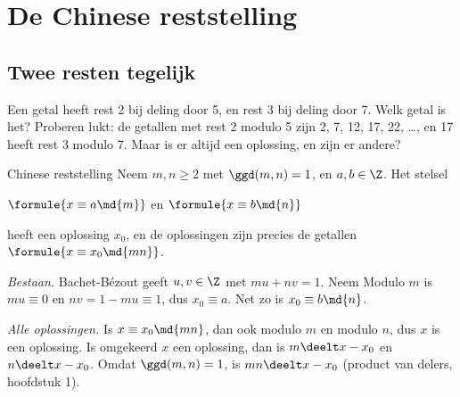 \section{De Chinese reststelling}

\subsection{Twee resten tegelijk}

Een getal heeft rest 2 bij deling door 5, en rest 3 bij deling door 7. Welk getal is het? Proberen lukt: de getallen met rest 2 modulo 5 zijn 2, 7, 12, 17, 22, \ldots, en 17 heeft rest 3 modulo 7. Maar is er altijd een oplossing, en zijn er andere?


\begin{theorie}
\begin{stelling}{Chinese reststelling}
Neem $m, n \geqslant 2$ met $\ggd(m, n) = 1$, en $a, b \in \Z$. Het stelsel

\vspace{1mm}
\qquad $\formule{x \equiv a \md{m}}$ \qquad en \qquad $\formule{x \equiv b \md{n}}$

\vspace{1mm}
heeft een oplossing $x_0$, en de oplossingen zijn precies de getallen $\formule{x \equiv x_0 \md{mn}}$.
\end{stelling}

\begin{bewijs}
\textit{Bestaan.} Bachet-Bézout geeft $u, v \in \Z$ met $mu + nv = 1$. Neem
Modulo $m$ is $mu \equiv 0$ en $nv = 1 - mu \equiv 1$, dus $x_0 \equiv a$. Net zo is $x_0 \equiv b \md{n}$.

\textit{Alle oplossingen.} Is $x \equiv x_0 \md{mn}$, dan ook modulo $m$ en modulo $n$, dus $x$ is een oplossing. Is omgekeerd $x$ een oplossing, dan is $m \deelt x - x_0$ en $n \deelt x - x_0$. Omdat $\ggd(m, n) = 1$, is $mn \deelt x - x_0$ (product van delers, hoofdstuk 1).
\end{bewijs}
\end{theorie}

